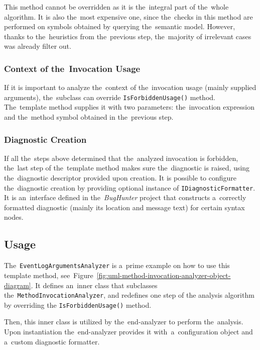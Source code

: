 \documentclass[
  digital, %
  table,   %
  lof,     %
  lot,     %
  oneside,
]{fithesis3}
\begin{document}
This method cannot be overridden as it is the~integral part of the~whole algorithm. It is also the~most expensive one, since the~checks in this method are performed on symbols obtained by querying the~semantic model. However, thanks to the~heuristics from the~previous step, the~majority of irrelevant cases was already filter out.

\subsubsection{\textbf{Context of the~Invocation Usage}}
If it is important to analyze the~context of the~invocation usage (mainly supplied arguments), the~subclass can override \texttt{IsForbiddenUsage()} method. The~template method supplies it with two parameters: the~invocation expression and the~method symbol obtained in the~previous step.

\subsubsection{\textbf{Diagnostic Creation}}
If all the~steps above determined that the~analyzed invocation is forbidden, the~last step of the~template method makes sure the~diagnostic is raised, using the~diagnostic descriptor provided upon creation. It is possible to configure the~diagnostic creation by providing optional instance of \texttt{IDiagnosticFormatter}. It is an~interface defined in the~\textit{BugHunter} project that constructs a~correctly formatted diagnostic (mainly its location and message text) for certain syntax nodes.

\subsection{Usage}
\label{sec:method-invocation-analyzer-usage}
The~\texttt{EventLogArgumentsAnalyzer} is a~prime example on how to use this template method, see~Figure~\ref{fig:uml-method-invocation-analyzer-object-diagram}. It defines an~inner class that subclasses the~\texttt{MethodInvocationAnalyzer}, and redefines one step of the analysis algorithm by overriding the \texttt{IsForbiddenUsage()} method.

Then, this inner class is utilized by the~end-analyzer to perform the~analysis. Upon instantiation the~end-analyzer provides it with~a~configuration object and a~custom diagnostic formatter. 
\end{document}
